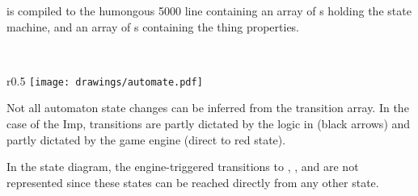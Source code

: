  is compiled to the humongous 5000 line  containing an array of s holding the state machine, and an array of s containing the thing properties.\\
\par
{}\\
\par
\begin{wrapfigure}[9]{r}{0.5\textwidth}
\centering
\texttt{[image: drawings/automate.pdf]}
\end{wrapfigure}
Not all automaton state changes can be inferred from the transition array. In the case of the Imp, transitions are partly dictated by the logic in  (black arrows) and partly dictated by the game engine (direct to red state).\\
\par
 In the state diagram, the engine-triggered transitions to , , and  are not represented since these states can be reached directly from any other state.
\par

\pagebreak

